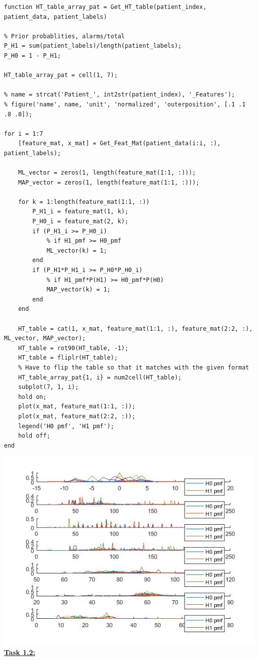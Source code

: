 \documentclass{article}
\begin{document}
\begin{lstlisting}
function HT_table_array_pat = Get_HT_table(patient_index, patient_data, patient_labels)

% Prior probablities, alarms/total
P_H1 = sum(patient_labels)/length(patient_labels);
P_H0 = 1 - P_H1;

HT_table_array_pat = cell(1, 7);

% name = strcat('Patient_', int2str(patient_index), '_Features');
% figure('name', name, 'unit', 'normalized', 'outerposition', [.1 .1 .8 .8]);

for i = 1:7
	[feature_mat, x_mat] = Get_Feat_Mat(patient_data(i:i, :), patient_labels);

	ML_vector = zeros(1, length(feature_mat(1:1, :)));
	MAP_vector = zeros(1, length(feature_mat(1:1, :)));

	for k = 1:length(feature_mat(1:1, :))
		P_H1_i = feature_mat(1, k);
		P_H0_i = feature_mat(2, k);
		if (P_H1_i >= P_H0_i)
			% if H1_pmf >= H0_pmf
			ML_vector(k) = 1;
		end
		if (P_H1*P_H1_i >= P_H0*P_H0_i)
			% if H1_pmf*P(H1) >= H0_pmf*P(H0)
			MAP_vector(k) = 1;
		end
	end

	HT_table = cat(1, x_mat, feature_mat(1:1, :), feature_mat(2:2, :), ML_vector, MAP_vector);
	HT_table = rot90(HT_table, -1);
	HT_table = fliplr(HT_table);
	% Have to flip the table so that it matches with the given format
	HT_table_array_pat{1, i} = num2cell(HT_table);
	subplot(7, 1, i);
 	hold on;
 	plot(x_mat, feature_mat(1:1, :));
 	plot(x_mat, feature_mat(2:2, :));
 	legend('H0 pmf', 'H1 pmf');
 	hold off;
end
\end{lstlisting}
\includegraphics[scale = 1]{untitled}
\underline{\textbf{Task 1.2:}}
\end{document}
